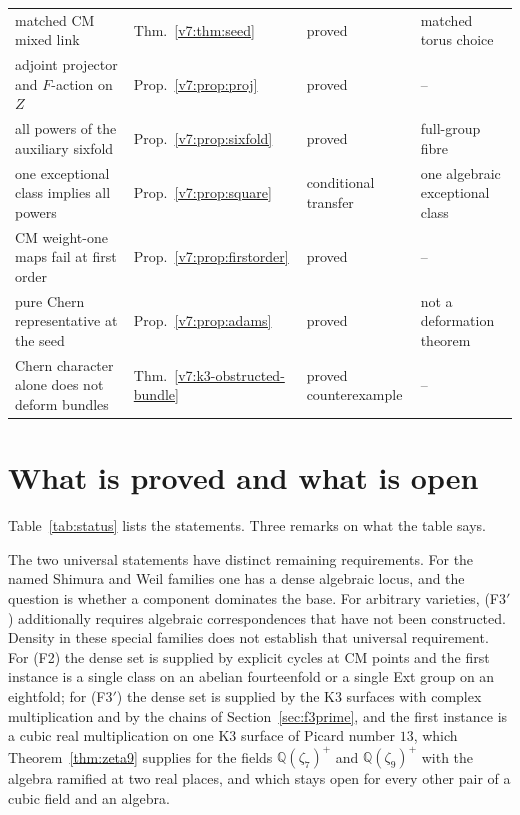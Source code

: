 \documentclass[11pt,reqno]{amsart}
\numberwithin{equation}{section}
\theoremstyle{plain}
\theoremstyle{definition}
\newcommand{\QQ}{\mathbb{Q}}
\newcommand{\Fii}{\texorpdfstring{\textup{(F2)}}{(F2)}}
\newcommand{\Fiii}{\texorpdfstring{\textup{(F3$'$)}}{(F3')}}
\begin{document}
\begin{longtable}{@{}>{\raggedright\arraybackslash}p{}>{\raggedright\arraybackslash}p{}>{\raggedright\arraybackslash}p{}>{\raggedright\arraybackslash}p{}@{}}
matched CM mixed link & Thm.~\ref{v7:thm:seed} & proved & matched torus choice \\
adjoint projector and $F$-action on $Z$ & Prop.~\ref{v7:prop:proj} & proved & -- \\
all powers of the auxiliary sixfold & Prop.~\ref{v7:prop:sixfold} & proved & full-group fibre \\
one exceptional class implies all powers & Prop.~\ref{v7:prop:square} & conditional transfer & one algebraic exceptional class \\
CM weight-one maps fail at first order & Prop.~\ref{v7:prop:firstorder} & proved & -- \\
pure Chern representative at the seed & Prop.~\ref{v7:prop:adams} & proved & not a deformation theorem \\
Chern character alone does not deform bundles & Thm.~\ref{v7:k3-obstructed-bundle} & proved counterexample & -- \\

\bottomrule
\end{longtable}
\endgroup

\section{What is proved and what is open}\label{sec:status}


Table~\ref{tab:status} lists the statements. Three remarks on what the table says.

The two universal statements have distinct remaining requirements. For the named Shimura and Weil families one has a dense algebraic locus, and the question is whether a component dominates the base. For arbitrary varieties, \Fiii{} additionally requires algebraic correspondences that have not been constructed. Density in these special families does not establish that universal requirement. For \Fii{} the dense set is supplied by explicit cycles at CM points and the first instance is a single class on an abelian fourteenfold or a single Ext group on an eightfold; for \Fiii{} the dense set is supplied by the K3 surfaces with complex multiplication and by the chains of Section~\ref{sec:f3prime}, and the first instance is a cubic real multiplication on one K3 surface of Picard number $13$, which Theorem~\ref{thm:zeta9} supplies for the fields $\QQ(\zeta_{7})^{+}$ and $\QQ(\zeta_{9})^{+}$ with the algebra ramified at two real places, and which stays open for every other pair of a cubic field and an algebra.
\end{document}
